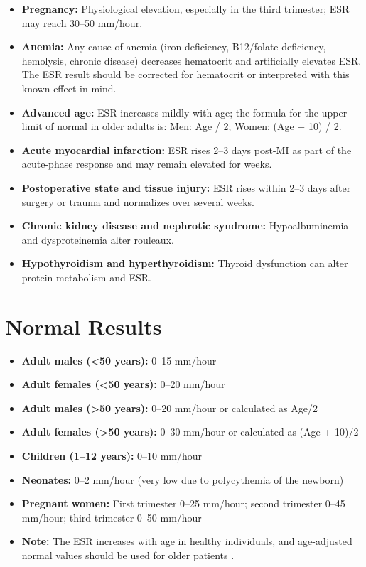 \begin{itemize}
  \item \textbf{Pregnancy:} Physiological elevation, especially in the third trimester; ESR may reach 30--50 mm/hour.
  \item \textbf{Anemia:} Any cause of anemia (iron deficiency, B12/folate deficiency, hemolysis, chronic disease) decreases hematocrit and artificially elevates ESR. The ESR result should be corrected for hematocrit or interpreted with this known effect in mind.
  \item \textbf{Advanced age:} ESR increases mildly with age; the formula for the upper limit of normal in older adults is: Men: Age / 2; Women: (Age + 10) / 2.
  \item \textbf{Acute myocardial infarction:} ESR rises 2--3 days post-MI as part of the acute-phase response and may remain elevated for weeks.
  \item \textbf{Postoperative state and tissue injury:} ESR rises within 2--3 days after surgery or trauma and normalizes over several weeks.
  \item \textbf{Chronic kidney disease and nephrotic syndrome:} Hypoalbuminemia and dysproteinemia alter rouleaux.
  \item \textbf{Hypothyroidism and hyperthyroidism:} Thyroid dysfunction can alter protein metabolism and ESR.
\end{itemize}

\section*{Normal Results}
\begin{itemize}
  \item \textbf{Adult males (<50 years):} 0--15 mm/hour
  \item \textbf{Adult females (<50 years):} 0--20 mm/hour
  \item \textbf{Adult males (>50 years):} 0--20 mm/hour or calculated as Age/2
  \item \textbf{Adult females (>50 years):} 0--30 mm/hour or calculated as (Age + 10)/2
  \item \textbf{Children (1--12 years):} 0--10 mm/hour
  \item \textbf{Neonates:} 0--2 mm/hour (very low due to polycythemia of the newborn)
  \item \textbf{Pregnant women:} First trimester 0--25 mm/hour; second trimester 0--45 mm/hour; third trimester 0--50 mm/hour
  \item \textbf{Note:} The ESR increases with age in healthy individuals, and age-adjusted normal values should be used for older patients \cite{wallach2022interpretation}.
\end{itemize}

